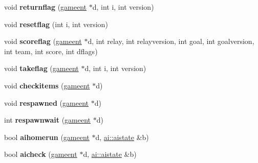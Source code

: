\begin{DoxyCompactItemize}
\item 
\mbox{\label{structgame_1_1ctfclientmode_a63ddd1821eea17d153439a90d3f36110}} 
void {\bfseries returnflag} (\hyperlink{structgameent}{gameent} $\ast$d, int i, int version)
\item 
\mbox{\label{structgame_1_1ctfclientmode_a3a127acaaeedff336c5673460f05a8ad}} 
void {\bfseries resetflag} (int i, int version)
\item 
\mbox{\label{structgame_1_1ctfclientmode_adb206c4fe3ae24830ac81c61b9858fd8}} 
void {\bfseries scoreflag} (\hyperlink{structgameent}{gameent} $\ast$d, int relay, int relayversion, int goal, int goalversion, int team, int score, int dflags)
\item 
\mbox{\label{structgame_1_1ctfclientmode_a04bcae426ddc60c5fc817eac1c872578}} 
void {\bfseries takeflag} (\hyperlink{structgameent}{gameent} $\ast$d, int i, int version)
\item 
\mbox{\label{structgame_1_1ctfclientmode_a90c2ecf1ec35ed4bad13560b1905e979}} 
void {\bfseries checkitems} (\hyperlink{structgameent}{gameent} $\ast$d)
\item 
\mbox{\label{structgame_1_1ctfclientmode_a2a8b0caba1dc9a195b8738519bb6d2b5}} 
void {\bfseries respawned} (\hyperlink{structgameent}{gameent} $\ast$d)
\item 
\mbox{\label{structgame_1_1ctfclientmode_a05652bb6deff45aaa04232b39d9e430e}} 
int {\bfseries respawnwait} (\hyperlink{structgameent}{gameent} $\ast$d)
\item 
\mbox{\label{structgame_1_1ctfclientmode_ae513a1a8863613f18652c983df32a4fe}} 
bool {\bfseries aihomerun} (\hyperlink{structgameent}{gameent} $\ast$d, \hyperlink{structai_1_1aistate}{ai\+::aistate} \&b)
\item 
\mbox{\label{structgame_1_1ctfclientmode_a0dc486f7e9cb2854b15012ae9e8f09a7}} 
bool {\bfseries aicheck} (\hyperlink{structgameent}{gameent} $\ast$d, \hyperlink{structai_1_1aistate}{ai\+::aistate} \&b)

\end{DoxyCompactItemize}
